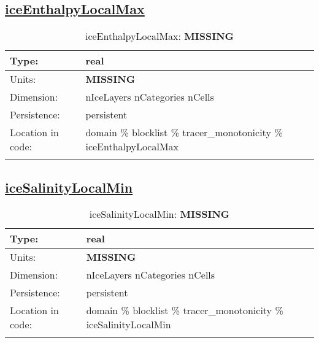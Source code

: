 \subsection[iceEnthalpyLocalMax]{\hyperref[sec:var_tab_tracer_monotonicity]{iceEnthalpyLocalMax}}
\label{subsec:var_sec_tracer_monotonicity_iceEnthalpyLocalMax}
\begin{center}
\begin{longtable}{| p{2.0in} | p{4.0in} |}
        \hline 
        Type: & real \\
        \hline 
        Units: & {\bf \color{red} MISSING} \\
        \hline 
        Dimension: & nIceLayers nCategories nCells \\
        \hline 
        Persistence: & persistent \\
        \hline 
         Location in code: & domain \% blocklist \% tracer\_monotonicity \% iceEnthalpyLocalMax \\
         \hline 
    \caption{iceEnthalpyLocalMax: {\bf \color{red} MISSING}}
\end{longtable}
\end{center}
\subsection[iceSalinityLocalMin]{\hyperref[sec:var_tab_tracer_monotonicity]{iceSalinityLocalMin}}
\label{subsec:var_sec_tracer_monotonicity_iceSalinityLocalMin}
\begin{center}
\begin{longtable}{| p{2.0in} | p{4.0in} |}
        \hline 
        Type: & real \\
        \hline 
        Units: & {\bf \color{red} MISSING} \\
        \hline 
        Dimension: & nIceLayers nCategories nCells \\
        \hline 
        Persistence: & persistent \\
        \hline 
         Location in code: & domain \% blocklist \% tracer\_monotonicity \% iceSalinityLocalMin \\
         \hline 
    \caption{iceSalinityLocalMin: {\bf \color{red} MISSING}}
\end{longtable}
\end{center}
